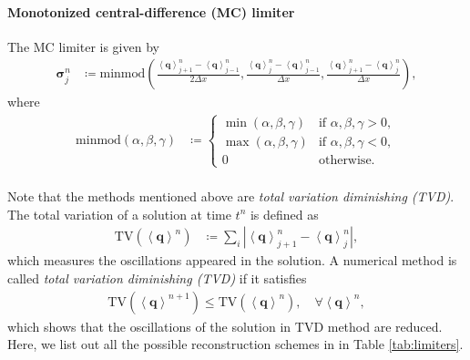 \paragraph{Monotonized central-difference (MC) limiter}
The MC limiter \cite{van1974towards} is given by
\begin{align}
    \mathbf{\sigma}^n_j &\coloneqq \text{minmod}\left(
    \frac{\left\langle \mathbf{q} \right\rangle^n_{j+1}-\left\langle \mathbf{q} \right\rangle^n_{j-1}}{2 \Delta x},
    \frac{\left\langle \mathbf{q} \right\rangle^n_j-\left\langle \mathbf{q} \right\rangle^n_{j-1}}{\Delta x},
    \frac{\left\langle \mathbf{q} \right\rangle^n_{j+1}-\left\langle \mathbf{q} \right\rangle^n_{j}}{\Delta x} \right),
\end{align}
where
\begin{align}
    \text{minmod}\left(\alpha, \beta, \gamma \right) &\coloneqq
    \begin{cases}
        \min\left(\alpha, \beta, \gamma\right) & \text{if } \alpha,\beta,\gamma > 0, \\
        \max\left(\alpha, \beta, \gamma\right) & \text{if } \alpha,\beta,\gamma < 0, \\
        0 & \text{otherwise}.
    \end{cases}
\end{align}\\
Note that the methods mentioned above are \textit{total variation diminishing (TVD)}.
The total variation of a solution at time $t^n$ is defined as
\begin{align}
    \text{TV}\left( \left\langle \mathbf{q} \right\rangle^n \right) &\coloneqq 
    \sum_i \left| \left\langle \mathbf{q} \right\rangle^n_{j+1} - \left\langle \mathbf{q} \right\rangle^n_j \right|,
\end{align}
which measures the oscillations appeared in the solution.
A numerical method is called \textit{total variation diminishing (TVD)} if it satisfies
\begin{align}
    \text{TV}\left( \left\langle \mathbf{q} \right\rangle^{n+1} \right) \leq
    \text{TV}\left( \left\langle \mathbf{q} \right\rangle^n \right), \quad \forall \left\langle \mathbf{q} \right\rangle^n,
\end{align}
which shows that the oscillations of the solution in TVD method are reduced.\\
Here, we list out all the possible reconstruction schemes in  in Table \ref{tab:limiters}.
